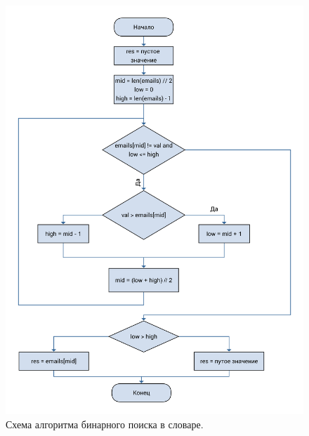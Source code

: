 \documentclass[a4paper, 12pt]{article}
\begin{document}
	\begin{figure}[h!]
		\centering \includegraphics[scale=0.07]{bin}
		\centering\caption{Схема алгоритма бинарного поиска в словаре.}
	\end{figure}
	\clearpage
	\newpage
\end{document}
